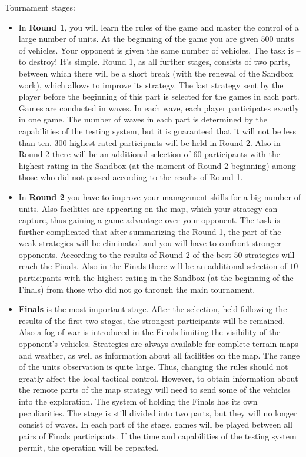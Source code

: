 Tournament stages:
\begin{itemize}
  \item In \textbf{Round 1}, you will learn the rules of the game and master the control of a large number of units. At the beginning of the game you are given
        $500$ units of vehicles. Your opponent is given the same number of vehicles. The task is -- to destroy! It's simple. Round 1, as all 
        further stages, consists of two parts, between which there will be a short break (with the renewal of the Sandbox work), which
        allows to improve its strategy. The last strategy sent by the player before the beginning of this part is selected for the games in each part.
        Games are conducted in waves. In each wave, each player participates exactly in one game. The number of waves in each part is determined by
        the capabilities of the testing system, but it is guaranteed that it will not be less than ten. $300$ highest rated participants
        will be held in Round 2. Also in Round 2 there will be an additional selection of $60$ participants with the highest rating in the Sandbox (at the moment
        of Round 2 beginning) among those who did not passed according to the results of Round 1.
  \item In \textbf{Round 2} you have to improve your management skills for a big number of units. Also facilities are appearing on the map,
        which your strategy can capture, thus gaining a game advantage over your opponent. The task is further complicated
        that after summarizing the Round 1, the part of the weak strategies will be eliminated and you will have to confront stronger opponents. According
        to the results of Round 2 of the best $50$ strategies will reach the Finals. Also in the Finals there will be an additional selection of $10$ participants with
        the highest rating in the Sandbox (at the beginning of the Finals) from those who did not go through the main tournament.
  \item \textbf{Finals} is the most important stage. After the selection, held following the results of the first two stages, the strongest participants will be remained. Also
        a fog of war is introduced in the Finals limiting the visibility of the opponent’s vehicles. Strategies are always available for complete terrain maps and
        weather, as well as information about all facilities on the map. The range of the units observation is quite large. Thus, changing the rules
        should not greatly affect the local tactical control. However, to obtain information about the remote parts of the map
        strategy will need to send some of the vehicles into the exploration. The system of holding the Finals has its own peculiarities. The stage is still
        divided into two parts, but they will no longer consist of waves. In each part of the stage, games will be played between all pairs
        of Finals participants. If the time and capabilities of the testing system permit, the operation will be repeated.
\end{itemize}


